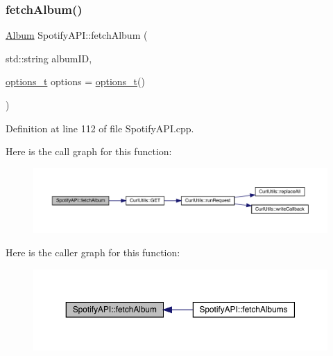 \subsubsection{\texorpdfstring{fetch\+Album()}{fetchAlbum()}}
{\footnotesize\ttfamily \mbox{\hyperlink{class_album}{Album}} Spotify\+A\+P\+I\+::fetch\+Album (\begin{DoxyParamCaption}\item[{std\+::string}]{album\+ID,  }\item[{\mbox{\hyperlink{_spotify_a_p_i_8h_a0ff5cac1a4007bb330b7d9939650c283}{options\+\_\+t}}}]{options = {\ttfamily \mbox{\hyperlink{_spotify_a_p_i_8h_a0ff5cac1a4007bb330b7d9939650c283}{options\+\_\+t}}()} }\end{DoxyParamCaption})}



Definition at line 112 of file Spotify\+A\+P\+I.\+cpp.

Here is the call graph for this function\+:
\nopagebreak
\begin{figure}[H]
\begin{center}
\leavevmode
\includegraphics[width=350pt]{class_spotify_a_p_i_aea55f7caebed1664d2c39d1c3c4612ec_cgraph}
\end{center}
\end{figure}
Here is the caller graph for this function\+:
\nopagebreak
\begin{figure}[H]
\begin{center}
\leavevmode
\includegraphics[width=350pt]{class_spotify_a_p_i_aea55f7caebed1664d2c39d1c3c4612ec_icgraph}
\end{center}
\end{figure}
\mbox{\label{class_spotify_a_p_i_ac2ec43ab2e207f7422c59f235cb2831f}} 
